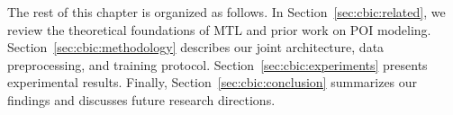 The rest of this chapter is organized as follows. In Section~\ref{sec:cbic:related}, we review the theoretical foundations of MTL and prior work on POI modeling. Section~\ref{sec:cbic:methodology} describes our joint architecture, data preprocessing, and training protocol. Section~\ref{sec:cbic:experiments} presents experimental results. Finally, Section~\ref{sec:cbic:conclusion} summarizes our findings and discusses future research directions.

